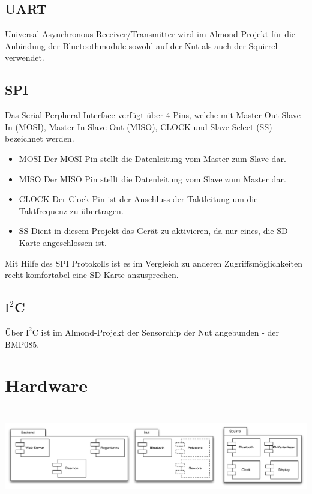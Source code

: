 \documentclass[12pt,a4paper]{article}
\begin{document}
	\subsection{UART}
Universal Asynchronous Receiver/Transmitter wird im Almond-Projekt für die Anbindung der Bluetoothmodule sowohl auf der Nut als auch der Squirrel verwendet.


	\subsection{SPI}
Das Serial Perpheral Interface verfügt über 4 Pins, welche mit Master-Out-Slave-In (MOSI), Master-In-Slave-Out (MISO), CLOCK und Slave-Select (SS) bezeichnet werden.
\begin{itemize}
\item MOSI
Der MOSI Pin stellt die Datenleitung vom Master zum Slave dar.
\item MISO
Der MISO Pin stellt die Datenleitung vom Slave zum Master dar.
\item CLOCK
Der Clock Pin ist der Anschluss der Taktleitung um die Taktfrequenz zu übertragen.
\item SS
Dient in diesem Projekt das Gerät zu aktivieren, da nur eines, die SD-Karte angeschlossen ist.
\end{itemize}
Mit Hilfe des SPI Protokolls ist es im Vergleich zu anderen Zugriffsmöglichkeiten recht komfortabel eine SD-Karte anzusprechen.

\subsection{$\text{I}^2$C}
Über $\text{I}^2$C ist im Almond-Projekt der Sensorchip der Nut angebunden - der BMP085.



\section{Hardware}

\includegraphics[height=4.2cm]{./Deployment.pdf}
\end{document}
